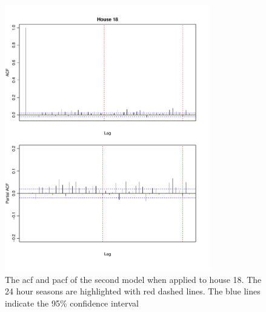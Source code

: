 \begin{figure}
    \centering
    \includegraphics[width=0.8\textwidth]{../../../figures/arimax/ACF_18_short.pdf}
    \caption{The acf and pacf of the second model when applied to house 18. The 24 hour seasons are highlighted with red dashed lines. The blue lines indicate the 95\% confidence interval}
    \label{fig:Model2_acf_18}
\end{figure}


